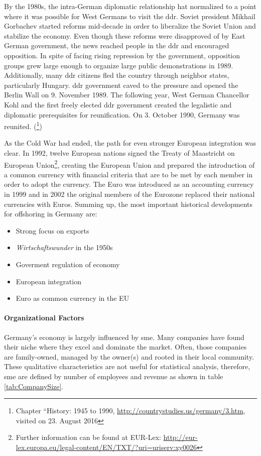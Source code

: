 By the 1980s, the intra-German diplomatic relationship hat normalized to a point where it was possible for West Germans to visit the \gls{ddr}. Soviet president Mikhail Gorbachev started reforms  mid-decade in order to liberalize the Soviet Union and stabilize the economy. Even though these reforms were disapproved of by East German government, the news reached people in the \gls{ddr} and encouraged opposition. In spite of facing rising repression by the government, opposition groups grew large enough to organize large public demonstrations in 1989. Additionally, many \gls{ddr} citizens fled the country through neighbor states, particularly Hungary. \Gls{ddr} government caved to the pressure and opened the Berlin Wall on 9. November 1989. The following year, West German Chancellor Kohl and the first freely elected \gls{ddr} government created the legalistic and diplomatic prerequisites for reunification. On 3. October 1990, Germany was reunited.
(\cite{Solsten.1995}\footnote{Chapter ``History: 1945 to 1990, \url{http://countrystudies.us/germany/3.htm}, visited on 23. August 2016})

As the Cold War had ended, the path for even stronger European integration was clear. In 1992, twelve European nations signed the Treaty of Maastricht on European Union\footnote{Further information can be found at EUR-Lex: \url{http://eur-lex.europa.eu/legal-content/EN/TXT/?uri=uriserv:xy0026}}, creating the European Union and prepared the introduction of a common currency with financial criteria that are to be met by each member in order to adopt the currency. The Euro was introduced as an accounting currency in 1999 and in 2002 the original members of the Eurozone replaced their national currencies with Euros.
\newpage
Summing up, the most important historical developments for offshoring in Germany are:
\begin{itemize}
	\item Strong focus on exports
	\item \textit{Wirtschaftswunder} in the 1950s
	\item Goverment regulation of economy
	\item European integration
	\item Euro as common currency in the EU
\end{itemize}


\paragraph{Organizational Factors}
Germany's economy is largely influenced by \gls{sme}. Many companies have found their niche where they excel and dominate the market. Often, those companies are family-owned, managed by the owner(s) and rooted in their local community. These qualitative characteristics are not useful for statistical analysis, therefore, \gls{sme} are defined by number of employees and revenue as shown in table \ref{tab:CompanySize}.

